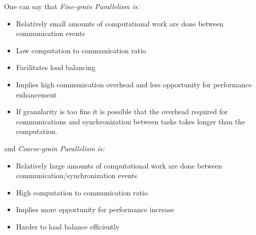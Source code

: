 One can say that \emph{Fine-grain Parallelism is:}
\begin{itemize}
  \item Relatively small amounts of computational work are done between communication events

  \item Low computation to communication ratio

  \item Facilitates load balancing

  \item Implies high communication overhead and less opportunity for performance enhancement

  \item If granularity is too fine it is possible that the overhead required for communications and synchronization between tasks takes longer than the computation.
\end{itemize}
and \emph{Coarse-grain Parallelism is:}
\begin{itemize}
  \item Relatively large amounts of computational work are done between communication/synchronization events

  \item High computation to communication ratio

  \item Implies more opportunity for performance increase

  \item Harder to load balance efficiently
\end{itemize}
